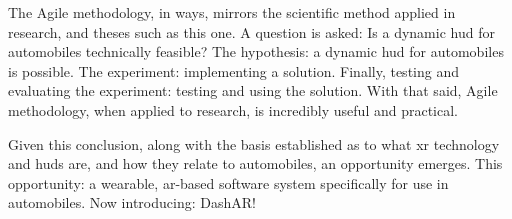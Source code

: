     \par The Agile methodology, in ways, mirrors the scientific method applied in research, and theses such as this one. A question is asked: Is a dynamic \gls{hud} for automobiles technically feasible? The hypothesis: a dynamic \gls{hud} for automobiles is possible. The experiment: implementing a solution. Finally, testing and evaluating the experiment: testing and using the solution. With that said, Agile methodology, when applied to research, is incredibly useful and practical.

    \par Given this conclusion, along with the basis established as to what \gls{xr} technology and \glspl{hud} are, and how they relate to automobiles, an opportunity emerges. This opportunity: a wearable, \gls{ar}-based software system specifically for use in automobiles. Now introducing: DashAR!
